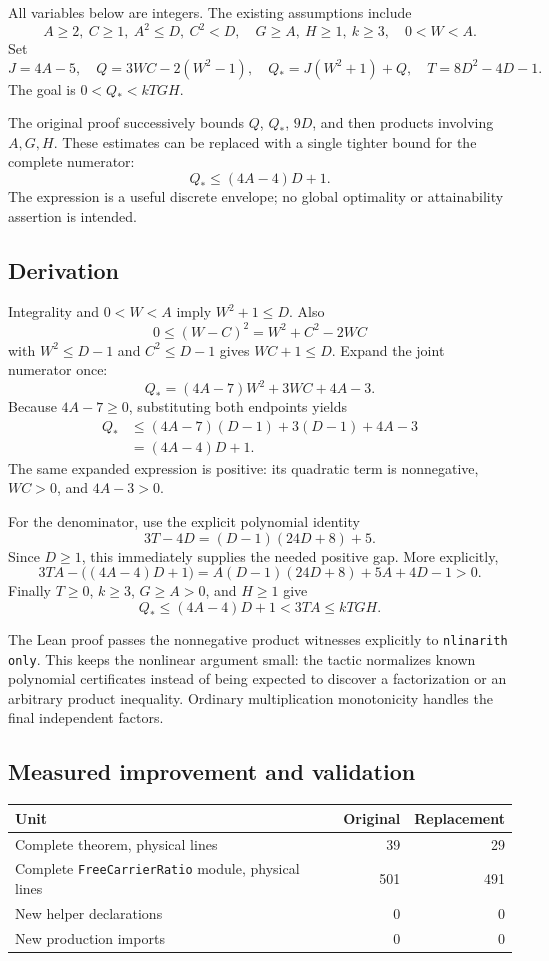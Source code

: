 \documentclass[11pt,a4paper]{article}
\newcommand{\code}[1]{\texttt{\small #1}}
\begin{document}
All variables below are integers. The existing assumptions include
\[
 A\ge2,\ C\ge1,\ A^2\le D,\ C^2<D,\quad
 G\ge A,\ H\ge1,\ k\ge3,\quad 0<W<A.
\]
Set
\[
 J=4A-5,\quad Q=3WC-2(W^2-1),\quad
 Q_*=J(W^2+1)+Q,\quad T=8D^2-4D-1.
\]
The goal is $0<Q_*<kTGH$.

The original proof successively bounds $Q$, $Q_*$, $9D$, and then products involving $A,G,H$. These estimates can be replaced with a single tighter bound for the complete numerator:
\begin{equation}\label{eq:envelope}
 Q_*\le(4A-4)D+1.
\end{equation}
The expression is a useful discrete envelope; no global optimality or attainability assertion is intended.

\subsection{Derivation}

Integrality and $0<W<A$ imply $W^2+1\le D$. Also
\[
 0\le(W-C)^2=W^2+C^2-2WC
\]
with $W^2\le D-1$ and $C^2\le D-1$ gives $WC+1\le D$. Expand the joint numerator once:
\[
 Q_*=(4A-7)W^2+3WC+4A-3.
\]
Because $4A-7\ge0$, substituting both endpoints yields
\begin{align*}
 Q_*&\le(4A-7)(D-1)+3(D-1)+4A-3\\
    &=(4A-4)D+1.
\end{align*}
The same expanded expression is positive: its quadratic term is nonnegative, $WC>0$, and $4A-3>0$.

For the denominator, use the explicit polynomial identity
\[
 3T-4D=(D-1)(24D+8)+5.
\]
Since $D\ge1$, this immediately supplies the needed positive gap. More explicitly,
\[
 3TA-\bigl((4A-4)D+1\bigr)
 =A(D-1)(24D+8)+5A+4D-1>0.
\]
Finally $T\ge0$, $k\ge3$, $G\ge A>0$, and $H\ge1$ give
\[
 Q_*\le(4A-4)D+1<3TA\le kTGH.
\]

The Lean proof passes the nonnegative product witnesses explicitly to \code{nlinarith only}. This keeps the nonlinear argument small: the tactic normalizes known polynomial certificates instead of being expected to discover a factorization or an arbitrary product inequality. Ordinary multiplication monotonicity handles the final independent factors.

\subsection{Measured improvement and validation}

\begin{tabularx}{\textwidth}{@{}Yrr@{}}
\toprule
Unit & Original & Replacement \\
\midrule
Complete theorem, physical lines & 39 & 29 \\
Complete \code{FreeCarrierRatio} module, physical lines & 501 & 491 \\
New helper declarations & 0 & 0 \\
New production imports & 0 & 0 \\
\bottomrule
\end{tabularx}
\end{document}

